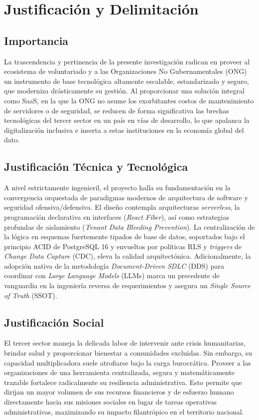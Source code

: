 \section{Justificación y Delimitación}
\subsection{Importancia}
La trascendencia y pertinencia de la presente investigación radican en proveer al ecosistema de voluntariado y a las Organizaciones No Gubernamentales (ONG) un instrumento de base tecnológica altamente escalable, estandarizado y seguro, que moderniza drásticamente su gestión. Al proporcionar una solución integral como SaaS, en la que la ONG no asume los exorbitantes costos de mantenimiento de servidores o de seguridad, se reducen de forma significativa las brechas tecnológicas del tercer sector en un país en vías de desarrollo, lo que apalanca la digitalización inclusiva e inserta a estas instituciones en la economía global del dato.

\subsection{Justificación Técnica y Tecnológica}
A nivel estrictamente ingenieril, el proyecto halla su fundamentación en la convergencia orquestada de paradigmas modernos de arquitectura de software y seguridad ofensiva/defensiva. El diseño contempla arquitecturas \textit{serverless}, la programación declarativa en interfaces (\textit{React Fiber}), así como estrategias profundas de aislamiento (\textit{Tenant Data Bleeding Prevention}). La centralización de la lógica en esquemas fuertemente tipados de base de datos, soportados bajo el principio ACID de PostgreSQL 16 y envueltos por políticas RLS y \textit{triggers} de \textit{Change Data Capture} (CDC), eleva la calidad arquitectónica. Adicionalmente, la adopción nativa de la metodología \textit{Document-Driven SDLC} (DDS) para coordinar con \textit{Large Language Models} (LLMs) marca un precedente de vanguardia en la ingeniería reversa de requerimientos y asegura un \textit{Single Source of Truth} (SSOT).

\subsection{Justificación Social}
El tercer sector maneja la delicada labor de intervenir ante crisis humanitarias, brindar salud y proporcionar bienestar a comunidades excluidas. Sin embargo, su capacidad multiplicadora suele atrofiarse bajo la carga burocrática. Proveer a las organizaciones de una herramienta centralizada, segura y matemáticamente trazable fortalece radicalmente su resiliencia administrativa. Esto permite que dirijan un mayor volumen de sus recursos financieros y de esfuerzo humano directamente hacia sus misiones sociales en lugar de tareas operativas administrativas, maximizando su impacto filantrópico en el territorio nacional.

